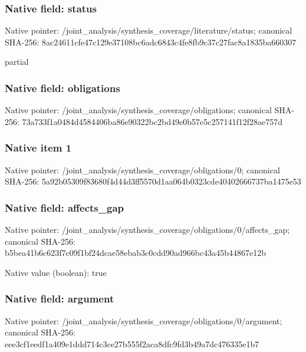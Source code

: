 \documentclass[10pt,a4paper]{article}
\begin{document}
\subsubsection{Native field: status}
Native pointer: /joint\_\allowbreak{}analysis/synthesis\_\allowbreak{}coverage/literature/status; canonical SHA-256: 8ac24611cfe47c129e37108bc6adc6843c4fe8fb9c37c27fac8a1835ba660307

\begingroup\raggedright\sloppy partial\par\endgroup

\subsubsection{Native field: obligations}
Native pointer: /joint\_\allowbreak{}analysis/synthesis\_\allowbreak{}coverage/obligations; canonical SHA-256: 73a733f1a0484d4584406ba86e90322bc2bd49e0b57e5c257141f12f28ae757d

\subsubsection{Native item 1}
Native pointer: /joint\_\allowbreak{}analysis/synthesis\_\allowbreak{}coverage/obligations/0; canonical SHA-256: 5a92b05309f83680f4d44d3ff5570d1aa064b0323cde40402666737ba1475e53

\subsubsection{Native field: affects\_\allowbreak{}gap}
Native pointer: /joint\_\allowbreak{}analysis/synthesis\_\allowbreak{}coverage/obligations/0/affects\_\allowbreak{}gap; canonical SHA-256: b5bea41b6c623f7c09f1bf24dcae58ebab3c0cdd90ad966bc43a45b44867e12b

Native value (boolean): true

\subsubsection{Native field: argument}
Native pointer: /joint\_\allowbreak{}analysis/synthesis\_\allowbreak{}coverage/obligations/0/argument; canonical SHA-256: eee3cf1eedf1a409e1ddd714c3ce27b555f2aca8dfc9fd3b49a7dc476335e1b7
\end{document}
